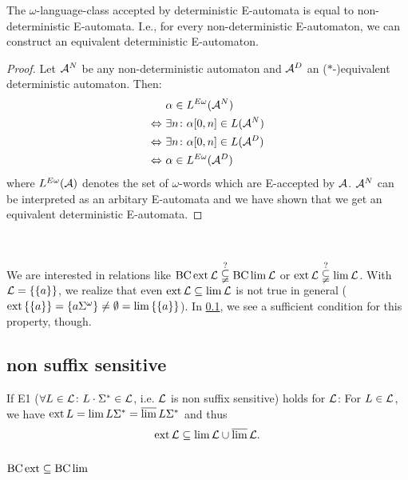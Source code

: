 \label{gen:e-determinism}
\begin{lemma}
The $\omega$-language-class accepted by deterministic E-automata is equal to non-deterministic E-automata. I.e., for every non-deterministic E-automaton, we can construct an equivalent deterministic E-automaton.
\begin{proof} Let $\mathcal{A}^N$ be any non-deterministic automaton and $\mathcal{A}^D$ an ($*$-)equivalent deterministic automaton. Then:
\begin{align*}
& \alpha \in L^{E\omega}(\mathcal{A}^N) \\
\Leftrightarrow \ & \exists n \colon \alpha[0,n] \in L(\mathcal{A}^N) \\
\Leftrightarrow \ & \exists n \colon \alpha[0,n] \in L(\mathcal{A}^D) \\
\Leftrightarrow \ & \alpha \in L^{E\omega}(\mathcal{A}^D)
\end{align*}
where $L^{E\omega}(\mathcal{A})$ denotes the set of $\omega$-words which are E-accepted by $\mathcal{A}$. $\mathcal{A}^N$ can be interpreted as an arbitary E-automata and we have shown that we get an equivalent deterministic E-automata.
\end{proof}
\end{lemma}

\

We are interested in relations like $\operatorname{BC} \operatorname{ext} \mathcal{L} \overset{?}{\subsetneqq} \operatorname{BC} \lim \mathcal{L}$ or $\operatorname{ext} \mathcal{L} \overset{?}{\subsetneqq} \lim \mathcal{L}$. With $\Lang = \Set{\Set{a}}$, we realize that even $\operatorname{ext} \mathcal{L} \subseteq \lim \mathcal{L}$ is not true in general ($\ext \Set{\Set{a}} = \Set{a \Sigma^\omega} \neq \emptyset = \lim \Set{\Set{a}}$). In \ref{gen:non-suffix-sens}, we see a sufficient condition for this property, though.

\subsection{non suffix sensitive}
\label{gen:non-suffix-sens}

If E1 ($\forall L \in \mathcal{L} \colon L \cdot \Sigma^* \in \mathcal{L}$, i.e. $\mathcal{L}$ is non suffix sensitive) holds for $\mathcal{L}$: For $L \in \mathcal{L}$, we have $\operatorname{ext} L = \lim L \Sigma^* = \operatorname{\overline{lim}} L \Sigma^*$ and thus
\[ \operatorname{ext} \mathcal{L} \subseteq \lim \mathcal{L} \cup \operatorname{\overline{lim}} \mathcal{L} . \]

\subsection{$\operatorname{BC} \operatorname{ext} \subseteq \operatorname{BC} \lim$}
\label{gen:S302a}

